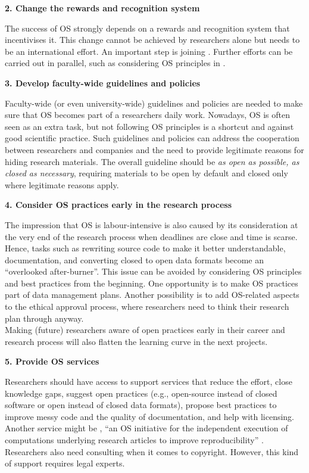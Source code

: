 \documentclass[gc, manuscript]{copernicus}
\begin{document}
\textbf{2. Change the rewards and recognition system}

The success of OS strongly depends on a rewards and recognition system
that incentivises it. This change cannot be achieved by researchers
alone but needs to be an international effort. An important step is
joining
\href{https://ec.europa.eu/info/news/process-towards-agreement-reforming-research-assessment-2022-jan-18_en}{\color{blue}{EU's process towards an agreement on reforming research assessment}}.
Further efforts can be carried out in parallel, such as considering OS
principles in
\href{https://www.nicebread.de/open-science-hiring-practices/}{\color{blue}{hiring decisions}}.

\textbf{3. Develop faculty-wide guidelines and policies}

Faculty-wide (or even university-wide) guidelines and policies are
needed to make sure that OS becomes part of a researchers daily work.
Nowadays, OS is often seen as an extra task, but not following OS
principles is a shortcut and against good scientific practice. Such
guidelines and policies can address the cooperation between researchers
and companies and the need to provide legitimate reasons for hiding
research materials. The overall guideline should be
\textit{as open as possible, as closed as necessary}, requiring
materials to be open by default and closed only where legitimate reasons
apply.

\textbf{4. Consider OS practices early in the research process}

The impression that OS is labour-intensive is also caused by its
consideration at the very end of the research process when deadlines are
close and time is scarse. Hence, tasks such as rewriting source code to
make it better understandable, documentation, and converting closed to
open data formats become an ``overlooked after-burner''. This issue can
be avoided by considering OS principles and best practices from the
beginning. One opportunity is to make OS practices part of data
management plans. Another possibility is to add OS-related aspects to
the ethical approval process, where researchers need to think their
research plan through anyway.\\
Making (future) researchers aware of open practices early in their
career and research process will also flatten the learning curve in the
next projects.

\textbf{5. Provide OS services}

Researchers should have access to support services that reduce the
effort, close knowledge gaps, suggest open practices (e.g., open-source
instead of closed software or open instead of closed data formats),
propose best practices to improve messy code and the quality of
documentation, and help with licensing. Another service might be
\href{https://www.itc.nl/research/open-science/codecheck/}{\color{blue}{CODECHECK}},
``an OS initiative for the independent execution of computations
underlying research articles to improve reproducibility''
\citep{N_st_2021}. Researchers also need consulting when it comes to
copyright. However, this kind of support requires legal experts.
\end{document}
